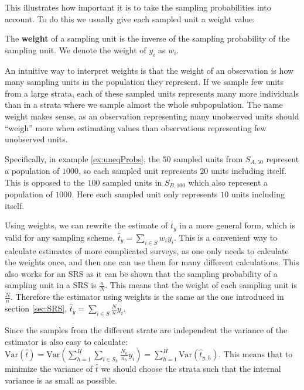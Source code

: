 \documentclass{article}
\begin{document}
This illustrates how important it is to take the sampling probabilities into
account. To do this we usually give each sampled unit a weight value:

\begin{definition}
 The \textbf{weight} of a sampling unit is the inverse of the sampling
 probability of the sampling unit. 
 We denote the weight of \(y_i\) as \(w_i\).
\end{definition}

An intuitive way to interpret weights is that the weight of an observation is
how many sampling units in the population they represent. If we sample few units
from a large strata, each of these sampled units represents many more individuals than
in a strata where we sample almost the whole subpopulation. The name weight
makes sense, as an observation representing many unobserved units should
``weigh'' more when estimating values than observations representing few
unobserved units.

Specifically, in example \ref{ex:uneqProbs}, the \(50\) sampled units from \(S_{A,
  50}\) represent a population of \(1000\), so each sampled unit represents
\(20\) units including itself. This is opposed to the \(100\) sampled units in
\(S_{B, 100}\) which also represent a population of \(1000\). Here each sampled
unit only represents \(10\) units including itself.


Using weights, we can rewrite the estimate of \(t_y\) in a more general form,
which is valid for any sampling scheme, \(\hat{t}_y = \sum_{i \in S}w_i y_i\).
This is a convenient way to calculate estimates of more complicated surveys, as
one only needs to calculate the weights once, and then one can use them for many
different calculations.
This also works for an SRS as it can be shown that the sampling probability of a sampling unit in a SRS is
\(\frac{n}{N}\). This means that the weight of each sampling unit is
\(\frac{N}{n}\). Therefore the estimator using weights is the same as the one
introduced in section \ref{sec:SRS}, \(\hat{t}_y = \sum_{i \in S}\frac{N}{n} y_i\).

Since the samples from the different strate are independent the variance of the estimator is also
easy to calculate: \(\mathrm{Var}(\hat{t}) = \mathrm{Var}\left(\sum_{h =
   1}^H\sum_{i \in S_h}\frac{N_h}{n_h}y_i\right) = \sum_{h =
   1}^H\mathrm{Var}\left(\hat{t}_{y, h}\right)\). This
means that to minimize the variance of \(\hat{t}\) we should choose the strata
such that the internal variance is as small as possible.
\end{document}
